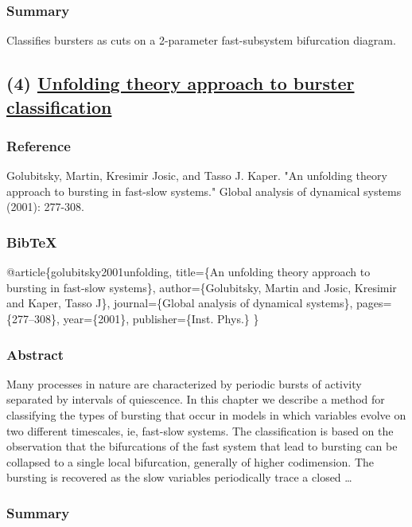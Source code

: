 \documentclass[11pt]{article}
\begin{document}
\subsubsection{Summary}
\label{sec:org6307ca5}
Classifies bursters as cuts on a 2-parameter fast-subsystem bifurcation diagram.

\subsection{(4) \href{https://www.asc.ohio-state.edu/golubitsky.4/reprintweb-0.5/output/papers/bursting12.pdf}{Unfolding theory approach to burster classification}}
\label{sec:org2cccd09}
\subsubsection{Reference}
\label{sec:org7b0cd4b}
Golubitsky, Martin, Kresimir Josic, and Tasso J. Kaper. "An unfolding theory approach to bursting in fast-slow systems." Global analysis of dynamical systems (2001): 277-308.

\subsubsection{BibTeX}
\label{sec:orgf21f320}
@article\{golubitsky2001unfolding,
  title=\{An unfolding theory approach to bursting in fast-slow systems\},
  author=\{Golubitsky, Martin and Josic, Kresimir and Kaper, Tasso J\},
  journal=\{Global analysis of dynamical systems\},
  pages=\{277--308\},
  year=\{2001\},
  publisher=\{Inst. Phys.\}
\}

\subsubsection{Abstract}
\label{sec:orgd417264}
Many processes in nature are characterized by periodic bursts of activity separated by intervals of quiescence. In this chapter we describe a method for classifying the types of bursting that occur in models in which variables evolve on two different timescales, ie, fast-slow systems. The classification is based on the observation that the bifurcations of the fast system that lead to bursting can be collapsed to a single local bifurcation, generally of higher codimension. The bursting is recovered as the slow variables periodically trace a closed \ldots{}

\subsubsection{Summary}
\label{sec:org0b2bd82}
\end{document}
